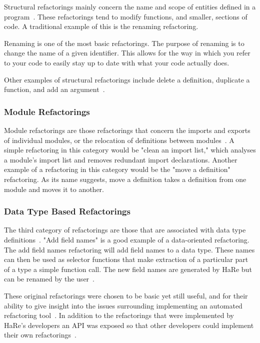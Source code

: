 Structural refactorings mainly concern the name and scope of entities defined in a program~\citep{huiqingThesis}. These refactorings tend to modify functions, and smaller, sections of code. A traditional example of this is the renaming refactoring. 

Renaming is one of the most basic refactorings. The purpose of renaming is to change the name of a given identifier. This allows for the way in which you refer to your code to easily stay up to date with what your code actually does. 

Other examples of structural refactorings include delete a definition, duplicate a function, and add an argument~\citep{huiqingThesis}.

\subsubsection{Module Refactorings}

Module refactorings are those refactorings that concern the imports and exports of individual modules, or the relocation of definitions between modules~\citep{huiqingThesis}. A simple refactoring in this category would be "clean an import list," which analyses a module's import list and removes redundant import declarations. Another example of a refactoring in this category would be the "move a definition" refactoring. As its name suggests, move a definition takes a definition from one module and moves it to another.

\subsubsection{Data Type Based Refactorings}

The third category of refactorings are those that are associated with data type definitions~\citep{huiqingThesis}. "Add field names" is a good example of a data-oriented refactoring.  The add field names refactoring will add field names to a data type. These names can then be used as selector functions that make extraction of a particular part of a type a simple function call. The new field names are generated by HaRe but can be renamed by the user~\citep{huiqingThesis}.

These original refactorings were chosen to be basic yet still useful, and for their ability to give insight into the issues surrounding implementing an automated refactoring tool~\citep{huiqingThesis}. In addition to the refactorings that were implemented by HaRe's developers an API was exposed so that other developers could implement their own refactorings~\citep{hareApi}.


